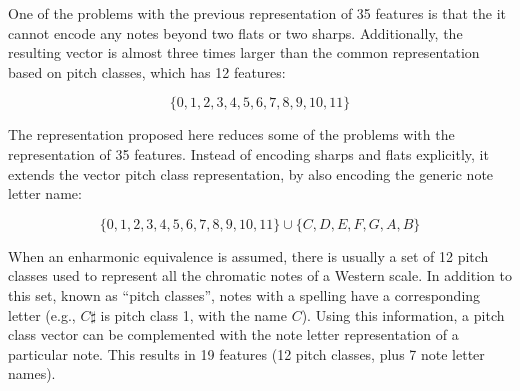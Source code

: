 
One of the problems with the previous representation of 35
features is that the it cannot encode any notes beyond two
flats or two sharps. Additionally, the resulting vector is
almost three times larger than the common representation
based on pitch classes, which has 12 features:

\begin{equation}
    \{0, 1, 2, 3, 4, 5, 6, 7, 8, 9, 10, 11\}
\end{equation}

The representation proposed here reduces some of the
problems with the representation of 35 features. Instead of
encoding sharps and flats explicitly, it extends the vector
pitch class representation, by also encoding the generic
note letter name:

\begin{equation}
    \{0, 1, 2, 3, 4, 5, 6, 7, 8, 9, 10, 11\} \cup \{C, D, E, F, G, A, B\}
\end{equation}

When an enharmonic equivalence is assumed, there is usually
a set of 12 pitch classes used to represent all the
chromatic notes of a Western scale. In addition to this set,
known as ``pitch classes'', notes with a spelling have a
corresponding letter (e.g., $C\sharp$ is pitch class 1, with
the name $C$). Using this information, a pitch class vector
can be complemented with the note letter representation of a
particular note. This results in 19 features (12 pitch
classes, plus 7 note letter names).
